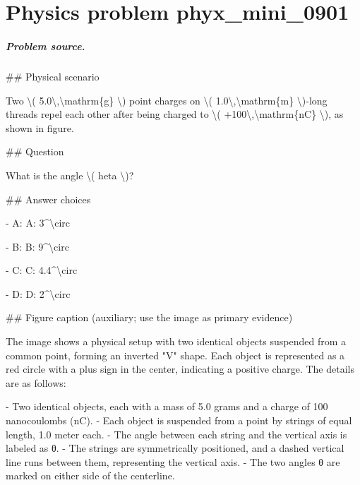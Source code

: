 
\chapter{Physics problem phyx\_mini\_0901}
\label{ch:PhyXMiniProblems_problem_phyx_mini_0901}

\paragraph{Problem source.}
\#\# Physical scenario

Two \textbackslash{}( 5.0\textbackslash{},\textbackslash{}mathrm\{g\} \textbackslash{}) point charges on \textbackslash{}( 1.0\textbackslash{},\textbackslash{}mathrm\{m\} \textbackslash{})-long threads repel each other after being charged to \textbackslash{}( +100\textbackslash{},\textbackslash{}mathrm\{nC\} \textbackslash{}), as shown in figure.

\#\# Question

What is the angle \textbackslash{}( 	heta \textbackslash{})?

\#\# Answer choices

- A: A: 3\textasciicircum{}\textbackslash{}circ

- B: B: 9\textasciicircum{}\textbackslash{}circ

- C: C: 4.4\textasciicircum{}\textbackslash{}circ

- D: D: 2\textasciicircum{}\textbackslash{}circ

\#\# Figure caption (auxiliary; use the image as primary evidence)

The image shows a physical setup with two identical objects suspended from a common point, forming an inverted "V" shape. Each object is represented as a red circle with a plus sign in the center, indicating a positive charge. The details are as follows:

- Two identical objects, each with a mass of 5.0 grams and a charge of 100 nanocoulombs (nC).
- Each object is suspended from a point by strings of equal length, 1.0 meter each.
- The angle between each string and the vertical axis is labeled as θ.
- The strings are symmetrically positioned, and a dashed vertical line runs between them, representing the vertical axis.
- The two angles θ are marked on either side of the centerline.

